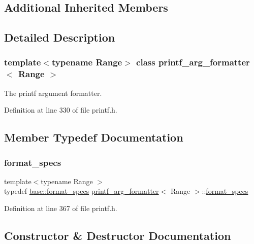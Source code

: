 \subsection*{Additional Inherited Members}


\subsection{Detailed Description}
\subsubsection*{template$<$typename Range$>$\newline
class printf\+\_\+arg\+\_\+formatter$<$ Range $>$}

The {\ttfamily printf} argument formatter.  

Definition at line 330 of file printf.\+h.



\subsection{Member Typedef Documentation}
\mbox{\label{classprintf__arg__formatter_ac9aa8ec04599fa4a6e0dc5645defc718}} 
\subsubsection{\texorpdfstring{format\+\_\+specs}{format\_specs}}
{\footnotesize\ttfamily template$<$typename Range $>$ \\
typedef \hyperlink{classinternal_1_1arg__formatter__base_acff46f7da1afa536210eb77a2ea0d775}{base\+::format\+\_\+specs} \hyperlink{classprintf__arg__formatter}{printf\+\_\+arg\+\_\+formatter}$<$ Range $>$\+::\hyperlink{classinternal_1_1arg__formatter__base_acff46f7da1afa536210eb77a2ea0d775}{format\+\_\+specs}}



Definition at line 367 of file printf.\+h.



\subsection{Constructor \& Destructor Documentation}
\mbox{\label{classprintf__arg__formatter_a776ca166c8295596e9636470e8522f66}} 
